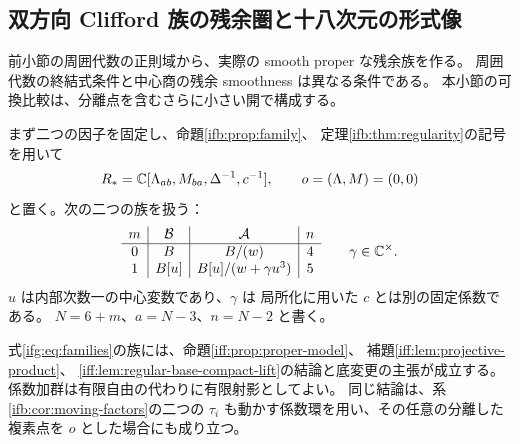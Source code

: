 \subsection{双方向 Clifford 族の残余圏と十八次元の形式像}
\label{ifg:subsec:geometry}

前小節の周囲代数の正則域から、実際の smooth proper な残余族を作る。
周囲代数の終結式条件と中心商の残余 smoothness は異なる条件である。
本小節の可換比較は、分離点を含むさらに小さい開で構成する。

まず二つの因子を固定し、命題\ref{ifb:prop:family}、
定理\ref{ifb:thm:regularity}の記号を用いて
\[
 R_*=\mathbb C[\Lambda_{ab},M_{ba},\Delta^{-1},c^{-1}],
 \qquad o=(\Lambda,M)=(0,0)
\]
と置く。次の二つの族を扱う：
\begin{equation}\label{ifg:eq:families}
 \begin{array}{c|c|c|c}
 m&\mathcal B&\mathcal A&n\\ \hline
 0&B&B/(w)&4\\
 1&B[u]&B[u]/(w+\gamma u^3)&5
 \end{array}
 \qquad \gamma\in\mathbb C^\times .
\end{equation}
$u$ は内部次数一の中心変数であり、$\gamma$ は
局所化に用いた $c$ とは別の固定係数である。
$N=6+m$、$a=N-3$、$n=N-2$ と書く。

\begin{lemma}[双方向族での射影積の入力]
\label{ifg:lem:projective-inputs}
式\eqref{ifg:eq:families}の族には、命題\ref{iff:prop:proper-model}、
補題\ref{iff:lem:projective-product}、
\ref{iff:lem:regular-base-compact-lift}の結論と底変更の主張が成立する。
係数加群は有限自由の代わりに有限射影としてよい。
同じ結論は、系\ref{ifb:cor:moving-factors}の二つの
$\tau_i$ も動かす係数環を用い、その任意の分離した複素点を $o$ とした場合にも成り立つ。
\end{lemma}

